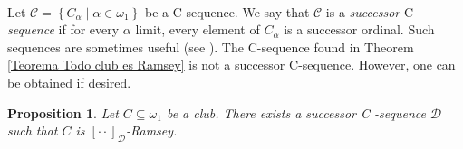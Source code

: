 \documentclass{article}
\newtheorem{proposition}[theorem]{Proposition}
\begin{document}
\qquad\ \qquad\ \qquad\ \ \ \ \ \qquad\qquad\qquad\ 

Let $\mathcal{C}=\left\{  C_{\alpha}\mid\alpha\in\omega_{1}\right\}  $ be a
\textsf{C}-sequence. We say that $\mathcal{C}$ is a \emph{successor}
\textsf{C}\emph{-sequence }if for every $\alpha$ limit, every element of
$C_{\alpha}$ is a successor ordinal. Such sequences are sometimes useful (see
\cite{Walks}). The \textsf{C}-sequence found in Theorem
\ref{Teorema Todo club es Ramsey} is not a successor \textsf{C}-sequence.
However, one can be obtained if desired.

\begin{proposition}
Let $C\subseteq\omega_{1}$ be a club. There exists a successor \textsf{C}%
-sequence $\mathcal{D}$ such that $C$ is $[\cdot\cdot]_{\mathcal{D}}$\emph{-}Ramsey.
\end{proposition}
\end{document}
